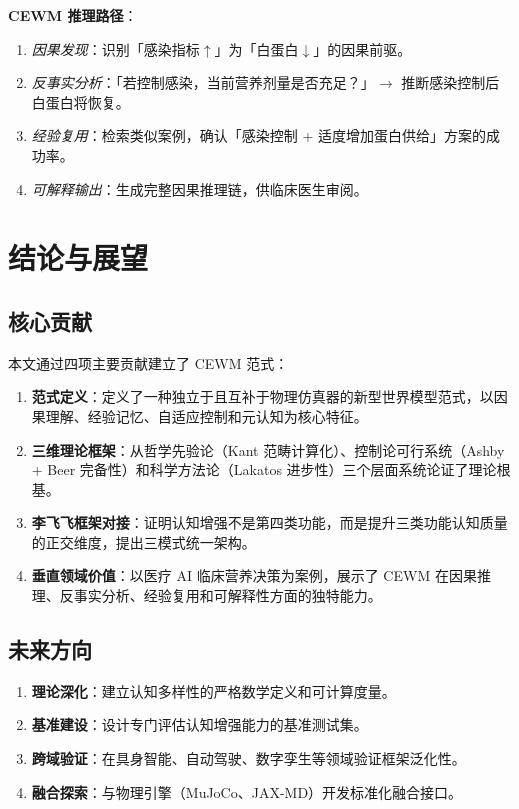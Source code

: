 \documentclass[11pt,a4paper]{article}
\newcommand{\CEWM}{\textsc{CEWM}}
\begin{document}
\textbf{\CEWM{} 推理路径}：
\begin{enumerate}[nosep]
  \item \emph{因果发现}：识别「感染指标$\uparrow$」为「白蛋白$\downarrow$」的因果前驱。
  \item \emph{反事实分析}：「若控制感染，当前营养剂量是否充足？」$\to$ 推断感染控制后白蛋白将恢复。
  \item \emph{经验复用}：检索类似案例，确认「感染控制 + 适度增加蛋白供给」方案的成功率。
  \item \emph{可解释输出}：生成完整因果推理链，供临床医生审阅。
\end{enumerate}

\section{结论与展望}\label{sec:conclusion}

\subsection{核心贡献}

本文通过四项主要贡献建立了 \CEWM{} 范式：
\begin{enumerate}
  \item \textbf{范式定义}：定义了一种独立于且互补于物理仿真器的新型世界模型范式，以因果理解、经验记忆、自适应控制和元认知为核心特征。
  \item \textbf{三维理论框架}：从哲学先验论（Kant 范畴计算化）、控制论可行系统（Ashby + Beer 完备性）和科学方法论（Lakatos 进步性）三个层面系统论证了理论根基。
  \item \textbf{李飞飞框架对接}：证明认知增强不是第四类功能，而是提升三类功能认知质量的正交维度，提出三模式统一架构。
  \item \textbf{垂直领域价值}：以医疗 AI 临床营养决策为案例，展示了 \CEWM{} 在因果推理、反事实分析、经验复用和可解释性方面的独特能力。
\end{enumerate}

\subsection{未来方向}

\begin{enumerate}[nosep]
  \item \textbf{理论深化}：建立认知多样性的严格数学定义和可计算度量。
  \item \textbf{基准建设}：设计专门评估认知增强能力的基准测试集。
  \item \textbf{跨域验证}：在具身智能、自动驾驶、数字孪生等领域验证框架泛化性。
  \item \textbf{融合探索}：与物理引擎（MuJoCo、JAX-MD）开发标准化融合接口。
\end{enumerate}
\end{document}

